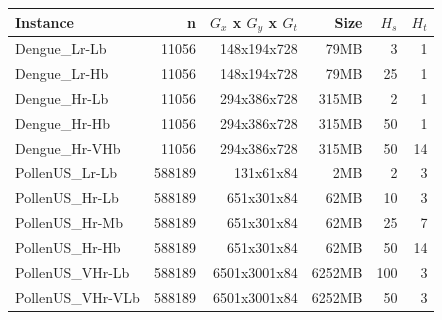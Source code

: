 \begin{tabular}{|l|rrr|rr|}
\hline
Instance & n & $G_x$ x $G_y$ x $G_t$ & Size & $H_s$ & $H_t$ \\
\hline
Dengue\_Lr-Lb & 11056 & 148x194x728 & 79MB & 3 & 1 \\
Dengue\_Lr-Hb & 11056 & 148x194x728 & 79MB & 25 & 1 \\
Dengue\_Hr-Lb & 11056 & 294x386x728 & 315MB & 2 & 1 \\
Dengue\_Hr-Hb & 11056 & 294x386x728 & 315MB & 50 & 1 \\
Dengue\_Hr-VHb & 11056 & 294x386x728 & 315MB & 50 & 14 \\
PollenUS\_Lr-Lb & 588189 & 131x61x84 & 2MB & 2 & 3 \\
PollenUS\_Hr-Lb & 588189 & 651x301x84 & 62MB & 10 & 3 \\
PollenUS\_Hr-Mb & 588189 & 651x301x84 & 62MB & 25 & 7 \\
PollenUS\_Hr-Hb & 588189 & 651x301x84 & 62MB & 50 & 14 \\
PollenUS\_VHr-Lb & 588189 & 6501x3001x84 & 6252MB & 100 & 3 \\
PollenUS\_VHr-VLb & 588189 & 6501x3001x84 & 6252MB & 50 & 3 \\
\hline
\end{tabular}
